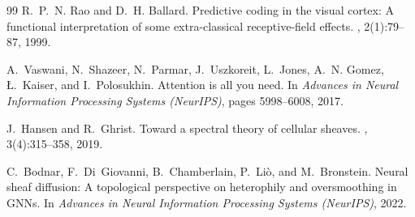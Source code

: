\documentclass[11pt]{article}
\begin{document}
\begin{thebibliography}{99}
R.~P.~N. Rao and D.~H. Ballard.
\newblock Predictive coding in the visual cortex: A functional interpretation of some extra-classical receptive-field effects.
, 2(1):79--87, 1999.

A.~Vaswani, N.~Shazeer, N.~Parmar, J.~Uszkoreit, L.~Jones, A.~N. Gomez, {\L}.~Kaiser, and I.~Polosukhin.
\newblock Attention is all you need.
\newblock In {\em Advances in Neural Information Processing Systems (NeurIPS)}, pages 5998--6008, 2017.

J.~Hansen and R.~Ghrist.
\newblock Toward a spectral theory of cellular sheaves.
, 3(4):315--358, 2019.

C.~Bodnar, F.~Di~Giovanni, B.~Chamberlain, P.~Li\`{o}, and M.~Bronstein.
\newblock Neural sheaf diffusion: A topological perspective on heterophily and oversmoothing in GNNs.
\newblock In {\em Advances in Neural Information Processing Systems (NeurIPS)}, 2022.

\end{thebibliography}
\end{document}

